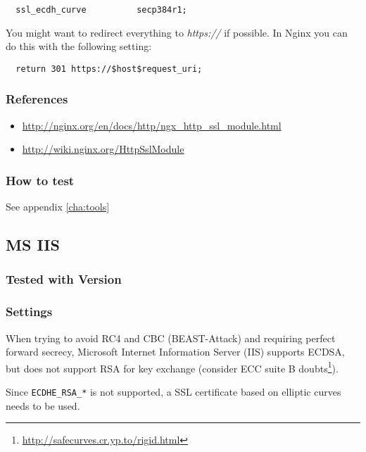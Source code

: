 \begin{lstlisting}
  ssl_ecdh_curve          secp384r1;
\end{lstlisting}

You might want to redirect everything to \emph{https://} if possible. In Nginx you can do this with the following setting:

\begin{lstlisting}
  return 301 https://$host$request_uri;
\end{lstlisting}


\subsubsection{References} 
\begin{itemize}
  \item \url{http://nginx.org/en/docs/http/ngx_http_ssl_module.html}
  \item \url{http://wiki.nginx.org/HttpSslModule}
\end{itemize}

\subsubsection{How to test}
See appendix \ref{cha:tools}

\subsection{MS IIS}
\label{sec:ms-iis}


\subsubsection{Tested with Version} 


\subsubsection{Settings}

When trying to avoid RC4 and CBC (BEAST-Attack) and requiring perfect
forward secrecy, Microsoft Internet Information Server (IIS) supports
ECDSA, but does not support RSA for key exchange (consider ECC suite
B doubts\footnote{\url{http://safecurves.cr.yp.to/rigid.html}}).

Since \verb|ECDHE_RSA_*| is not supported, a SSL certificate based on
elliptic curves needs to be used.

